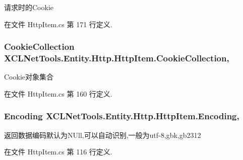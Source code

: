 请求时的\-Cookie 



在文件 Http\-Item.\-cs 第 171 行定义.

\hypertarget{class_x_c_l_net_tools_1_1_entity_1_1_http_1_1_http_item_a6130bb5eec4b2b63c195ee5ae2c9bbfd}{
\subsubsection[{Cookie\-Collection}]{\setlength{\rightskip}{0pt plus 5cm}Cookie\-Collection X\-C\-L\-Net\-Tools.\-Entity.\-Http.\-Http\-Item.\-Cookie\-Collection\hspace{0.3cm}{\ttfamily [get]}, {\ttfamily [set]}}}\label{class_x_c_l_net_tools_1_1_entity_1_1_http_1_1_http_item_a6130bb5eec4b2b63c195ee5ae2c9bbfd}


Cookie对象集合 



在文件 Http\-Item.\-cs 第 160 行定义.

\hypertarget{class_x_c_l_net_tools_1_1_entity_1_1_http_1_1_http_item_aefaad52c96c7c2b692f3470b61cd75eb}{
\subsubsection[{Encoding}]{\setlength{\rightskip}{0pt plus 5cm}Encoding X\-C\-L\-Net\-Tools.\-Entity.\-Http.\-Http\-Item.\-Encoding\hspace{0.3cm}{\ttfamily [get]}, {\ttfamily [set]}}}\label{class_x_c_l_net_tools_1_1_entity_1_1_http_1_1_http_item_aefaad52c96c7c2b692f3470b61cd75eb}


返回数据编码默认为\-N\-Ull,可以自动识别,一般为utf-\/8,gbk,gb2312 



在文件 Http\-Item.\-cs 第 116 行定义.

